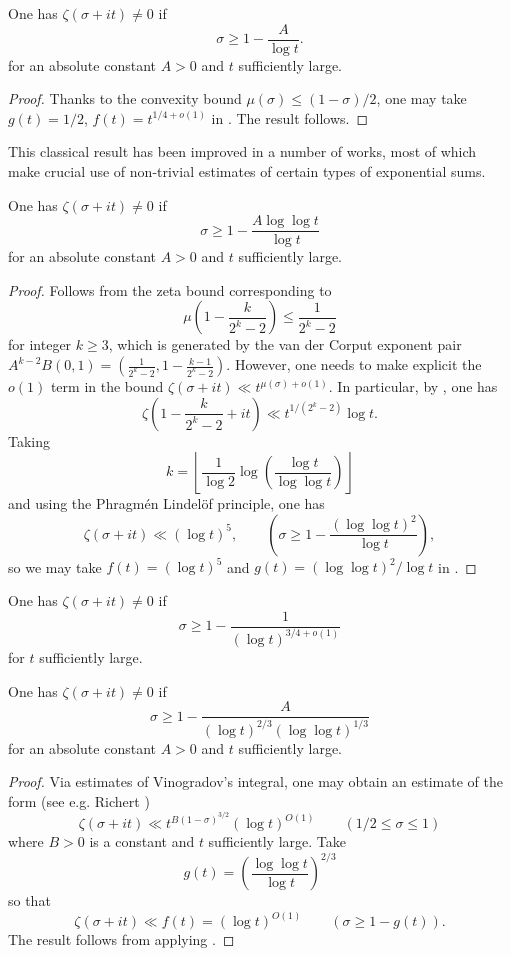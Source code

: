 \begin{theorem}\label{zfr-classical}
One has $\zeta(\sigma + it) \ne 0$ if
\[
\sigma \ge 1 - \frac{A}{\log t}.
\]
for an absolute constant $A > 0$ and $t$ sufficiently large.
\end{theorem}
\begin{proof}
Thanks to the convexity bound $\mu(\sigma) \le (1-\sigma)/2$, one may take $g(t) = 1/2$, $f(t) = t^{1/4 + o(1)}$ in . The result follows.
\end{proof}

This classical result has been improved in a number of works, most of which make crucial use of non-trivial estimates of certain types of exponential sums.

\begin{theorem}\label{zfr-littlewood}
One has $\zeta(\sigma + it) \ne 0$ if
\[
\sigma \ge 1 - \frac{A \log\log t}{\log t}
\]
for an absolute constant $A > 0$ and $t$ sufficiently large.
\end{theorem}
\begin{proof}
Follows from the zeta bound corresponding to
\[
\mu\left(1 - \frac{k}{2^k - 2}\right) \le \frac{1}{2^k - 2}
\]
for integer $k\ge 3$, which is generated by the van der Corput exponent pair $A^{k - 2}B(0, 1) = (\frac{1}{2^k - 2}, 1 - \frac{k - 1}{2^k - 2})$. However, one needs to make explicit the $o(1)$ term in the bound $\zeta(\sigma + it) \ll t^{\mu(\sigma) + o(1)}$. In particular, by \cite[Theorem 5.14]{titchmarsh_theory_1986}, one has
\[
\zeta(1 - \frac{k}{2^k - 2} + it) \ll t^{1/(2^k - 2)}\log t.
\]
Taking
\[
k = \left\lfloor \frac{1}{\log 2}\log\left(\frac{\log t}{\log\log t}\right)\right\rfloor
\]
and using the Phragm\'en Lindel\"of principle, one has
\[
\zeta(\sigma + it) \ll (\log t)^5,\qquad (\sigma \ge 1 - \frac{(\log\log t)^2}{\log t}),
\]
so we may take $f(t) = (\log t)^5$ and $g(t) = (\log\log t)^2/\log t$ in .
\end{proof}

\begin{theorem}\label{zfr-chudakov}
One has $\zeta(\sigma + it) \ne 0$ if
\[
\sigma \ge 1 - \frac{1}{(\log t)^{3/4 + o(1)}}
\]
for $t$ sufficiently large.
\end{theorem}

\begin{theorem}\label{zfr-vk}
One has $\zeta(\sigma + it) \ne 0$ if
\[
\sigma \ge 1 - \frac{A}{(\log t)^{2/3}(\log\log t)^{1/3}}
\]
for an absolute constant $A > 0$ and $t$ sufficiently large.
\end{theorem}
\begin{proof}
Via estimates of Vinogradov's integral, one may obtain an estimate of the form (see e.g. Richert \cite{richert_zur_1967})
\[
\zeta(\sigma + it) \ll t^{B(1 - \sigma)^{3/2}}(\log t)^{O(1)}\qquad (1/2 \le \sigma \le 1)
\]
where $B > 0$ is a constant and $t$ sufficiently large. Take
\[
g(t) = \left(\frac{\log\log t}{\log t}\right)^{2/3}
\]
so that
\[
\zeta(\sigma + it) \ll f(t) = (\log t)^{O(1)}\qquad (\sigma \ge 1 - g(t)).
\]
The result follows from applying .
\end{proof}
